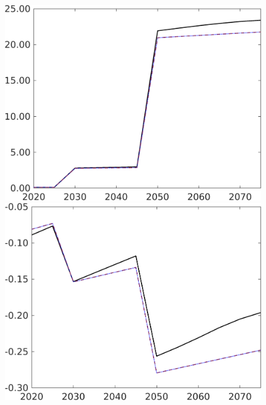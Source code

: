 \begin{figure}[h!!]
\begin{minipage}[]{0.32\textwidth}
	\end{minipage}
	\begin{minipage}[]{0.32\textwidth}
		\includegraphics[width=1\textwidth]{../../codding_model/own_basedOnFried/optimalPol_190722_tidiedUp/figures/all_July22/GFF_CompEffOPT_T_NoTaus_pol4_spillover0_noskill1_sep1_xgrowth0_etaa0.79_lgd0_lff0.png}
	\end{minipage}
	\begin{minipage}[]{0.32\textwidth}
		\includegraphics[width=1\textwidth]{../../codding_model/own_basedOnFried/optimalPol_190722_tidiedUp/figures/all_July22/SWF_CompEffOPT_T_NoTaus_pol4_spillover0_noskill1_sep1_xgrowth0_etaa0.79_lgd0_lff0.png}

\end{minipage}
\end{figure}
